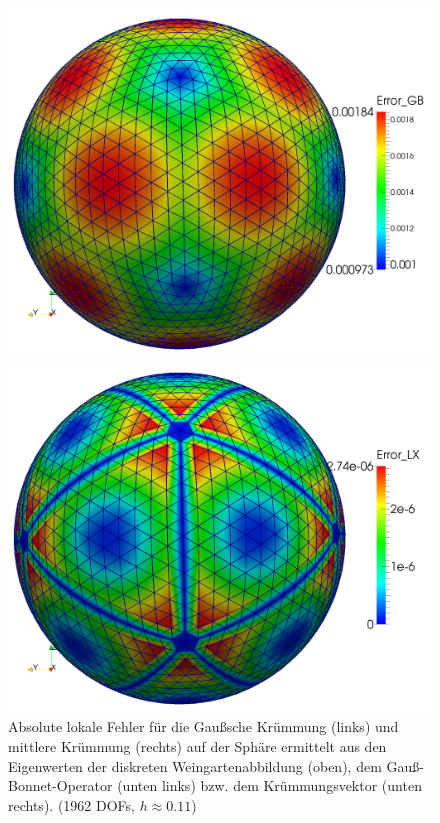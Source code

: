 \begin{figure}
\begin{minipage}[t]{0.49\textwidth}
    \end{minipage}\\
    \begin{minipage}[t]{0.49\textwidth}
       \centering\includegraphics[width=\textwidth]{bilder/Curvature/sphere/ErrGB2k.png}
    \end{minipage}\hfill
    \begin{minipage}[t]{0.49\textwidth}
       \centering\includegraphics[width=\textwidth]{bilder/Curvature/sphere/ErrLX2k.png}
    \end{minipage}
    \caption[Fehler (Krümmungen auf Sphäre)]
            {Absolute lokale Fehler für die Gaußsche Krümmung (links) und mittlere Krümmung (rechts) auf der Sphäre
             ermittelt aus den Eigenwerten der diskreten Weingartenabbildung (oben), dem
             Gauß-Bonnet-Operator (unten links) bzw. dem Krümmungsvektor (unten rechts).
             (1962 DOFs, \( h\approx0.11 \))}
    \label{figErrCurvSphere}
  \end{figure}

